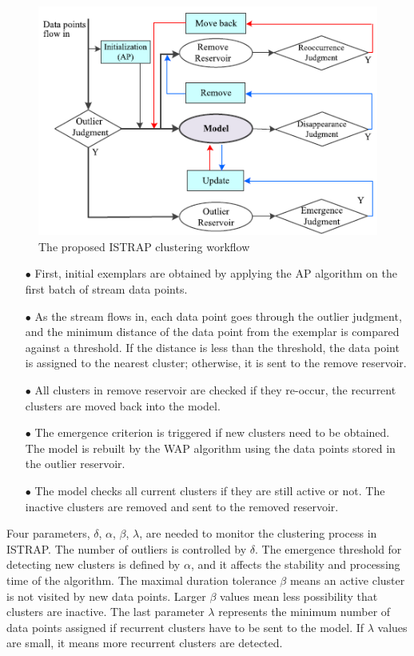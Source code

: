 \begin{figure}[t]
\centering
\includegraphics[width =10 cm]{image/Chapters/Chapter3/istrap1.PNG}
\caption{The proposed ISTRAP clustering workflow}
\label{istrap}
\end{figure}

\begin{itemize}
    \item[$\bullet$] First, initial exemplars are obtained by applying the AP algorithm on the first batch of stream data points.
    \item[$\bullet$] As the stream flows in, each data point goes through the outlier judgment, and the minimum distance of the data point from the exemplar is compared against a threshold. If the distance is less than the threshold, the data point is assigned to the nearest cluster; otherwise, it is sent to the remove reservoir.
    \item[$\bullet$] All clusters in remove reservoir are checked if they re-occur, the recurrent clusters are moved back into the model.
    \item[$\bullet$] The emergence criterion is triggered if new clusters need to be obtained. The model is rebuilt by the WAP algorithm using the data points stored in the outlier reservoir.
    \item[$\bullet$] The model checks all current clusters if they are still active or not. The inactive clusters are removed and sent to the removed reservoir.
\end{itemize}

Four parameters, $\delta$, $\alpha$, $\beta$, $\lambda$, are needed to monitor the clustering process in ISTRAP. The number of outliers is controlled by $\delta$. The emergence threshold for detecting new clusters is defined by $\alpha$, and it affects the stability and processing time of the algorithm. The maximal duration tolerance $\beta$ means an active cluster is not visited by new data points. Larger $\beta$ values mean less possibility that clusters are inactive. The last parameter $\lambda$ represents the minimum number of data points assigned if recurrent clusters have to be sent to the model. If $\lambda$ values are small, it means more recurrent clusters are detected. 

